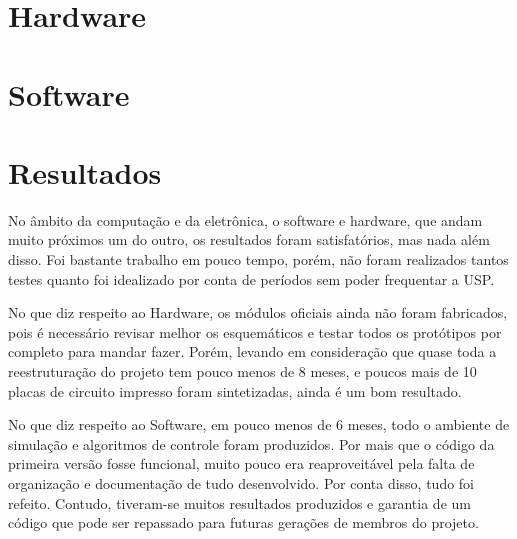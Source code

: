 \documentclass[]{politex}
\begin{document}

\part{Hardware} 





\part{Software}







\begin{comment} %



\end{comment}

\part{Resultados}

No âmbito da computação e da eletrônica, o software e hardware, que andam muito próximos um do outro, os resultados foram satisfatórios, mas nada além disso. Foi bastante trabalho em pouco tempo, porém, não foram realizados tantos testes quanto foi idealizado por conta de períodos sem poder frequentar a USP.

No que diz respeito ao Hardware, os módulos oficiais ainda não foram fabricados, pois é necessário revisar melhor os esquemáticos e testar todos os protótipos por completo para mandar fazer. Porém, levando em consideração que quase toda a reestruturação do projeto tem pouco menos de 8 meses, e poucos mais de 10 placas de circuito impresso foram sintetizadas, ainda é um bom resultado.

No que diz respeito ao Software, em pouco menos de 6 meses, todo o ambiente de simulação e algoritmos de controle foram produzidos. Por mais que o código da primeira versão fosse funcional, muito pouco era reaproveitável pela falta de organização e documentação de tudo desenvolvido. Por conta disso, tudo foi refeito. Contudo, tiveram-se muitos resultados produzidos e garantia de um código que pode ser repassado para futuras gerações de membros do projeto.
\end{document}
